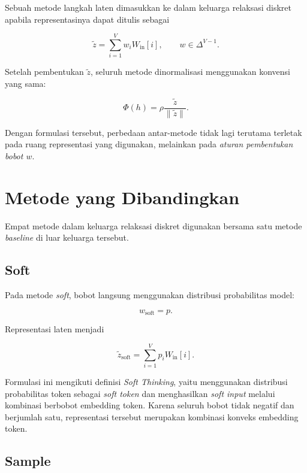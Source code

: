 Sebuah metode langkah laten dimasukkan ke dalam keluarga relaksasi diskret apabila representasinya dapat ditulis sebagai

\begin{equation}
\tilde z
=
\sum_{i=1}^{V}
w_iW_{\mathrm{in}}[i],
\qquad
w\in\Delta^{V-1}.
\end{equation}

Setelah pembentukan \(\tilde z\), seluruh metode dinormalisasi menggunakan konvensi yang sama:

\begin{equation}
\Phi(h)
=
\rho
\frac{\tilde z}{\|\tilde z\|}.
\end{equation}

Dengan formulasi tersebut, perbedaan antar-metode tidak lagi terutama terletak pada ruang representasi yang digunakan, melainkan pada \textit{aturan pembentukan bobot \(w\)}.

\section{Metode yang Dibandingkan}

Empat metode dalam keluarga relaksasi diskret digunakan bersama satu metode \textit{baseline} di luar keluarga tersebut.

\subsection{Soft}

Pada metode \textit{soft}, bobot langsung menggunakan distribusi probabilitas model:

\begin{equation}
w_{\mathrm{soft}}=p.
\end{equation}

Representasi laten menjadi

\begin{equation}
\tilde z_{\mathrm{soft}}
=
\sum_{i=1}^{V}
p_iW_{\mathrm{in}}[i].
\end{equation}

Formulasi ini mengikuti definisi \textit{Soft Thinking}, yaitu menggunakan distribusi probabilitas token sebagai \textit{soft token} dan menghasilkan \textit{soft input} melalui kombinasi berbobot embedding token. Karena seluruh bobot tidak negatif dan berjumlah satu, representasi tersebut merupakan kombinasi konveks embedding token.

\subsection{Sample}

